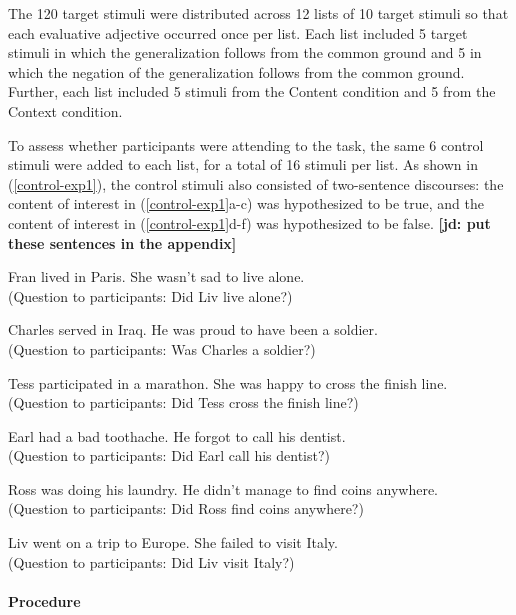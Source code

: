 \documentclass[11pt,fleqn]{article}
\newcommand{\6}{\mbox{$[\hspace*{-.6mm}[$}}
\newcommand{\9}{\mbox{$]\hspace*{-.6mm}]$}}
\newcommand{\jd}[1]{\textbf{\color{red}[jd: #1]}}
\begin{document}
The 120 target stimuli were distributed across 12 lists of 10 target stimuli so that each evaluative adjective occurred once per list. Each list included 5 target stimuli in which the generalization follows from the common ground and 5 in which the negation of the generalization follows from the common ground. Further, each list included 5 stimuli from the Content condition and 5 from the Context condition.

To assess whether participants were attending to the task, the same 6 control stimuli were added to each list, for a total of 16 stimuli per list. As shown in (\ref{control-exp1}), the control stimuli also consisted of two-sentence discourses: the content of interest in (\ref{control-exp1}a-c) was hypothesized to be true, and the content of interest in (\ref{control-exp1}d-f) was hypothesized to be false. \jd{put these sentences in the appendix}

\begin{exe}
\ex\label{control-exp1} 

\begin{xlist}

\ex Fran lived in Paris. She wasn't sad to live alone. \\ (Question to participants: Did Liv live alone?)

\ex Charles served in Iraq. He was proud to have been a soldier. \\ (Question to participants: Was Charles a soldier?)

\ex Tess participated in a marathon. She was happy to cross the finish line. \\ (Question to participants: Did Tess cross the finish line?)


\ex Earl had a bad toothache. He forgot to
call his dentist. \\ (Question to participants: Did Earl call his
dentist?)

\ex Ross was doing his laundry. He didn't manage to find coins anywhere. \\ (Question to participants: Did Ross find coins anywhere?)

\ex Liv went on a trip to Europe. She failed to visit Italy. \\
(Question to participants: Did Liv visit Italy?)

\end{xlist}
\end{exe}

\paragraph{Procedure}
\end{document}
